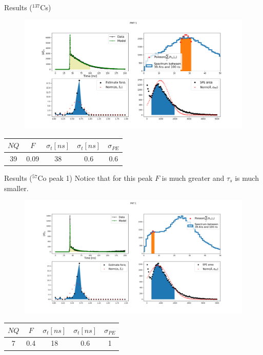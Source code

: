 \documentclass{beamer}
\begin{document}
\begin{frame}{Results ($^{137}$Cs)}
\begin{figure}[h]
\includegraphics[width=1\linewidth]{Cs.png}
\end{figure}

\begin{center}
\begin{tabular}{ |c| c| c| c| c|}
\hline
 $NQ$ & $F$ & $\sigma_t [ns]$ & $\sigma_t [ns]$ & $\sigma_{PE}$\\ 
\hline
39 & 0.09 & 38 & 0.6 & 0.6\\  
\hline   
\end{tabular}
\end{center}
\end{frame}

\begin{frame}{Results ($^{57}$Co peak 1)}
Notice that for this peak $F$ is much greater and $\tau_s$ is much smaller.
\begin{figure}[h]
\includegraphics[width=1\linewidth]{Co1.png}
\end{figure}

\begin{center}
\begin{tabular}{ |c| c| c| c| c|}
\hline
 $NQ$ & $F$ & $\sigma_t [ns]$ & $\sigma_t [ns]$ & $\sigma_{PE}$\\ 
\hline
7 & 0.4 & 18 & 0.6 & 1\\  
\hline   
\end{tabular}
\end{center}
\end{frame}
\end{document}

